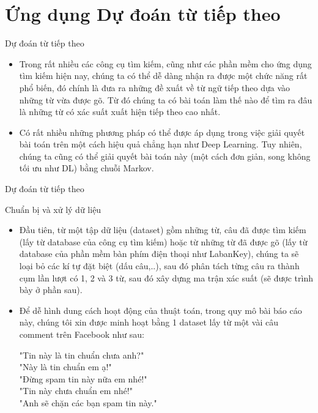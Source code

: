 \section{Ứng dụng Dự đoán từ tiếp theo}
\begin{frame}{Dự đoán từ tiếp theo}
\begin{myproblem*}{}
    \begin{itemize}
        \item[\bullet] Trong rất nhiều các công cụ tìm kiếm, cũng như các phần mềm cho ứng dụng tìm kiếm hiện nay, chúng ta có thể dễ dàng nhận ra được một chức năng rất phổ biến, đó chính là đưa ra những đề xuất về từ ngữ tiếp theo dựa vào những từ vừa được gõ. Từ đó chúng ta có bài toán làm thế nào để tìm ra đâu là những từ có xác suất xuất hiện tiếp theo cao nhất.
        \item[\bullet] Có rất nhiều những phương pháp có thể được áp dụng trong việc giải quyết bài toán trên một cách hiệu quả chẳng hạn như Deep Learning. Tuy nhiên, chúng ta cũng có thể giải quyết bài toán này (một cách đơn giản, song không tối ưu như DL) bằng chuỗi Markov.
    \end{itemize}
\end{myproblem*}
\end{frame}

\begin{frame}{Dự đoán từ tiếp theo}
\begin{LARGE}
Chuẩn bị và xử lý dữ liệu \par
\end{LARGE}
\begin{itemize}
    \item[\bullet] Đầu tiên, từ một tập dữ liệu (dataset) gồm những từ, câu đã được tìm kiếm (lấy từ database của công cụ tìm kiếm) hoặc từ những từ đã được gõ (lấy từ database của phần mềm bàn phím điện thoại như LabanKey), chúng ta sẽ loại bỏ các kí tự đặt biệt (dấu câu,..), sau đó phân tách từng câu ra thành cụm lần lượt có 1, 2 và 3 từ, sau đó xây dựng ma trận xác suất (sẽ được trình bày ở phần sau). 
    \item[\bullet] Để dễ hình dung cách hoạt động của thuật toán, trong quy mô bài báo cáo này, chúng tôi xin được minh hoạt bằng 1 dataset lấy từ một vài câu comment trên Facebook như sau:

    \begin{center}
    "Tin này là tin chuẩn chưa anh?" \\
    "Này là tin chuẩn em ạ!" \\
    "Đừng spam tin này nữa em nhé!" \\
    "Tin này chưa chuẩn em nhé!" \\
    "Anh sẽ chặn các bạn spam tin này." 
    \end{center}
\end{itemize}
\end{frame}

